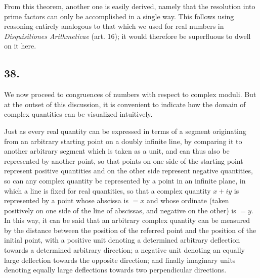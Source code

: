 \documentclass[twoside,12pt]{memoir}
\begin{document}
From this theorem, another one is easily derived, namely that the resolution into prime factors can only be accomplished in a single way. This follows using reasoning entirely analogous to that which we used for real numbers in \textit{Disquisitiones Arithmeticae} (art. 16); it would therefore be superfluous to dwell on it here.

\subsection*{38.}

We now proceed to congruences of numbers with respect to complex moduli. But at the outset of this discussion, it is convenient to indicate how the domain of complex quantities can be visualized intuitively.

Just as every real quantity can be expressed in terms of a segment originating from an arbitrary starting point on a doubly infinite line, by comparing it to another arbitrary segment which is taken as a unit, and can thus also be represented by another point, so that points on one side of the starting point represent positive quantities and on the other side represent negative quantities, so can any complex quantity be represented by a point in an infinite plane, in which a line is fixed for real quantities, so that a complex quantity \(x+i y\) is represented by a point whose abscissa is \(=x\) and whose ordinate (taken positively on one side of the line of abscissas, and negative on the other) is \(=y\). In this way, it can be said that an arbitrary complex quantity can be measured by the distance between the position of the referred point and the position of the initial point, with a positive unit denoting a determined arbitrary deflection towards a determined arbitrary direction; a negative unit denoting an equally large deflection towards the opposite direction; and finally imaginary units denoting equally large deflections towards two perpendicular directions.
\end{document}
